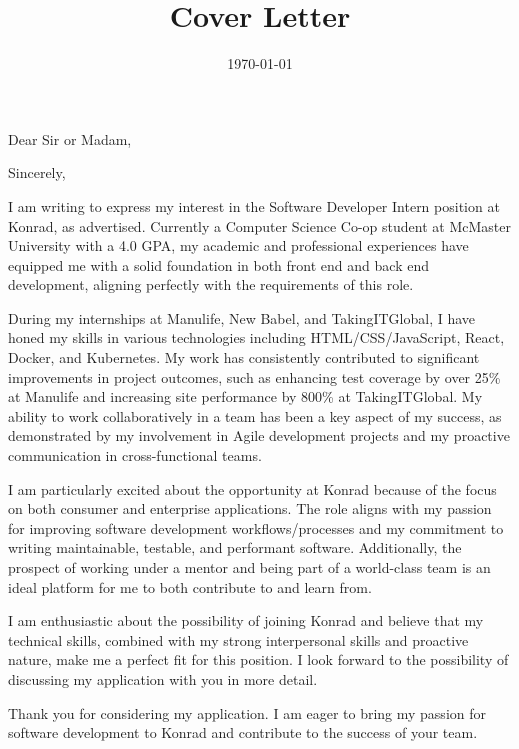 \documentclass[11pt, letterpaper, sans]{moderncv}
\title{Cover Letter}
\begin{document}
\clearpage

\newcommand{\positionname}{Software Developer Intern} %
\newcommand{\companyname}{Konrad Group} %

\recipient{Hiring Manager}{\companyname{}} %
\date{\today} %
\opening{Dear Sir or Madam,} %
\closing{Sincerely,} %

\makelettertitle %

I am writing to express my interest in the Software Developer Intern position at Konrad, as advertised.
Currently a Computer Science Co-op student at McMaster University with a 4.0 GPA,
my academic and professional experiences have equipped me with a solid foundation in both front end and back end development,
aligning perfectly with the requirements of this role.

During my internships at Manulife, New Babel, and TakingITGlobal,
I have honed my skills in various technologies including HTML/CSS/JavaScript, React, Docker, and Kubernetes.
My work has consistently contributed to significant improvements in project outcomes,
such as enhancing test coverage by over 25\% at Manulife
and increasing site performance by 800\% at TakingITGlobal.
My ability to work collaboratively in a team has been a key aspect of my success,
as demonstrated by my involvement in Agile development projects and my proactive communication in cross-functional teams.

I am particularly excited about the opportunity at Konrad because of the focus on both consumer and enterprise applications.
The role aligns with my passion for improving software development workflows/processes
and my commitment to writing maintainable, testable, and performant software.
Additionally, the prospect of working under a mentor
and being part of a world-class team is an ideal platform for me to both contribute to and learn from.

I am enthusiastic about the possibility of joining Konrad and believe that my technical skills,
combined with my strong interpersonal skills and proactive nature, make me a perfect fit for this position.
I look forward to the possibility of discussing my application with you in more detail.

Thank you for considering my application.
I am eager to bring my passion for software development to Konrad and contribute to the success of your team.

\makeletterclosing %

\newpage
\end{document}
